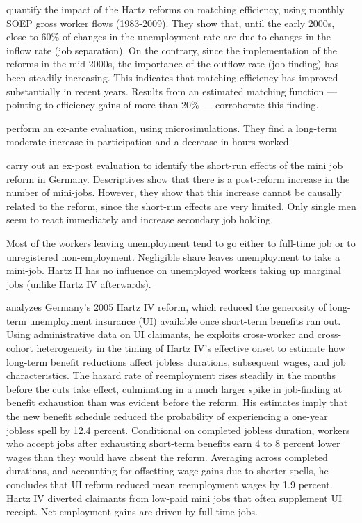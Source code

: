 \documentclass[12pt, a4paper]{article}
\begin{document}
\cite{HertweckSigrist2012} quantify the impact of the Hartz reforms on matching efficiency, using monthly SOEP gross worker flows (1983-2009). They show that, until the early 2000s, close to 60\% of changes in the unemployment rate are due to changes in the inflow rate (job separation). On the contrary, since the implementation of the reforms in the mid-2000s, the importance of the outflow rate (job finding) has been steadily increasing. This indicates that matching efficiency has improved substantially in recent years. Results from an estimated matching function — pointing to efficiency gains of more than 20\% — corroborate this finding.

\cite{BargainCaliendoHaanOrsini10} perform an ex-ante evaluation, using microsimulations. They find a long-term moderate increase in participation and a decrease in hours worked.

\cite{CaliendoWrohlick10} carry out an ex-post evaluation to identify the short-run effects of the mini job reform in Germany. Descriptives show that there is a post-reform increase in the number of mini-jobs. However, they show that this increase cannot be causally related to the reform, since the short-run effects are very limited. Only single men seem to react immediately and increase secondary job holding.

\cite{CarriTuRo15} Most of the workers leaving unemployment tend to go either to full-time job or to unregistered non-employment. Negligible share leaves unemployment to take a mini-job. Hartz II has no influence on unemployed workers taking up marginal jobs (unlike Hartz IV afterwards).

\cite{Price16} analyzes Germany's 2005 Hartz IV reform, which reduced the generosity of long-term unemployment insurance (UI) available once short-term benefits ran out. Using administrative data on UI claimants, he exploits cross-worker and cross-cohort heterogeneity in the timing of Hartz IV's effective onset to estimate how long-term benefit reductions affect jobless durations, subsequent wages, and job characteristics. The hazard rate of reemployment rises steadily in the months before the cuts take effect, culminating in a much larger spike in job-finding at benefit exhaustion than was evident before the reform. His estimates imply that the new benefit schedule reduced the probability of experiencing a one-year jobless spell by 12.4 percent. Conditional on completed jobless duration, workers who accept jobs after exhausting short-term benefits earn 4 to 8 percent lower wages than they would have absent the reform. Averaging across completed durations, and accounting for offsetting wage gains due to shorter spells, he concludes that UI reform reduced mean reemployment wages by 1.9 percent. Hartz IV diverted claimants from low-paid mini jobs that often supplement UI receipt. Net employment gains are driven by full-time jobs.
\end{document}
